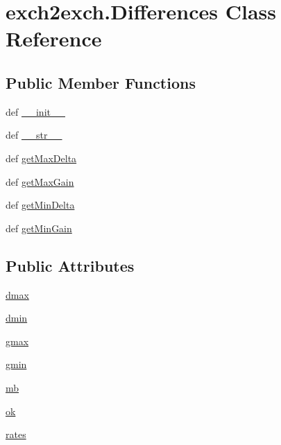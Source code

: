 \hypertarget{classexch2exch_1_1_differences}{\section{exch2exch.\-Differences Class Reference}
\label{classexch2exch_1_1_differences}
}
\subsection*{Public Member Functions}
\begin{DoxyCompactItemize}
\item 
def \hyperlink{classexch2exch_1_1_differences_a233d3aa10e3542a0d8229b299384b2b8}{\-\_\-\-\_\-init\-\_\-\-\_\-}
\item 
def \hyperlink{classexch2exch_1_1_differences_a4dbc60a284d9679bb9682d46112ee1bf}{\-\_\-\-\_\-str\-\_\-\-\_\-}
\item 
def \hyperlink{classexch2exch_1_1_differences_a3083b0bcc349937fb7ad708bc683e3d4}{get\-Max\-Delta}
\item 
def \hyperlink{classexch2exch_1_1_differences_a83359c7999d33257746aa09f653e41fa}{get\-Max\-Gain}
\item 
def \hyperlink{classexch2exch_1_1_differences_ae6156c3361371d1688de9b334ef7dc8d}{get\-Min\-Delta}
\item 
def \hyperlink{classexch2exch_1_1_differences_a3c7fc587dedfda0e303260f244021017}{get\-Min\-Gain}
\end{DoxyCompactItemize}
\subsection*{Public Attributes}
\begin{DoxyCompactItemize}
\item 
\hyperlink{classexch2exch_1_1_differences_a261a74cc25d77b2608898fa5611f9f0b}{dmax}
\item 
\hyperlink{classexch2exch_1_1_differences_a7825bfca16b5775aa770c8810412b215}{dmin}
\item 
\hyperlink{classexch2exch_1_1_differences_a569f2a6fa0e33ad725c3c3ada259ddcc}{gmax}
\item 
\hyperlink{classexch2exch_1_1_differences_a33c9add531b5b46c49ae322657343382}{gmin}
\item 
\hyperlink{classexch2exch_1_1_differences_a81c81e9c15b5ea8a5d39bb99d85250e1}{mb}
\item 
\hyperlink{classexch2exch_1_1_differences_a6de3ee563584c83a97ba815db8ec7831}{ok}
\item 
\hyperlink{classexch2exch_1_1_differences_a64aec2fc7f20028f0bd834908cbea116}{rates}
\end{DoxyCompactItemize}


